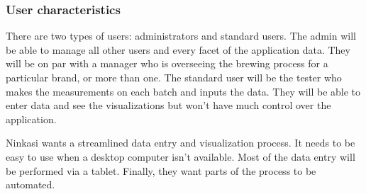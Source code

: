 \documentclass[draftclsnofoot,onecolumn,journal,letterpaper,compsoc,10pt]{IEEEtran}
\begin{document}
        \subsubsection{User characteristics}
        There are two types of users: administrators and standard users.  The admin will be able to manage all other users and every facet of the application data. They will be on par with a manager who is overseeing the brewing process for a particular brand, or more than one.  The standard user will be the tester who makes the measurements on each batch and inputs the data.  They will be able to enter data and see the visualizations but won't have much control over the application.
        
        Ninkasi wants a streamlined data entry and visualization process.  It needs to be easy to use when a desktop computer isn't available.  Most of the data entry will be performed via a tablet.  Finally, they want parts of the process to be automated.
\end{document}
